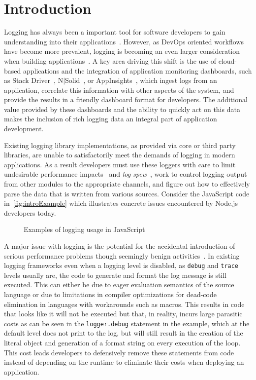\documentclass[sigplan,10pt]{acmart}
\begin{document}
\section{Introduction} 
\label{sec:intro}
Logging has always been a important tool for software developers to 
gain understanding into their applications~\cite{logdebug,logdebug2,logstudy}. 
However, as DevOps oriented workflows have
become more prevalent, logging is becoming an even larger consideration when
building applications~\cite{logstudy,logstudy2}. A key area driving this shift is the use of cloud-based
applications and the integration of application monitoring dashboards, such as
Stack Driver~\cite{StackDriver}, N$|$Solid~\cite{NSolid}, or
AppInsights~\cite{AppInsights}, which ingest logs from an application, correlate
this information with other aspects of the system, and provide the results in a friendly
dashboard format for developers. The additional value provided by these
dashboards and the ability to quickly act on this data makes the inclusion of
rich logging data an integral part of application development.

Existing logging library implementations, as provided via core or third party
libraries, are unable to satisfactorily meet the demands of logging in modern
applications. As a result developers must use these loggers with care to
limit undesirable performance impacts~\cite{learnlog} and \emph{log spew}~\cite{learnlog,logstudy2}, work 
to control logging output from other modules to the appropriate channels, and figure
out how to effectively parse the data that is written from various sources.
Consider the JavaScript code in~\autoref{fig:introExample} 
which illustrates concrete issues encountered by Node.js~\cite{Node} developers today.

\begin{figure*}[t]

\caption{Examples of logging usage in JavaScript}
\label{fig:introExample}
\end{figure*}

A major issue with logging is the potential for the accidental introduction 
of serious performance problems though seemingly benign activities~\cite{logdebug,logdebug2,logstudy,learnlog,logstudy2}. In 
existing logging frameworks even when a logging level is disabled, 
as \texttt{debug} and \texttt{trace} levels usually are, the code to generate 
and format the log message is still executed. This can either be due to eager 
evaluation semantics of the source language or due to limitations in compiler 
optimizations for dead-code elimination in languages with workarounds such as 
macros. This results in code that looks like it will not be executed but that, in 
reality, incurs large parasitic costs as can be seen in the \texttt{logger.debug} 
statement in the example, which at the default level does not print to the log, but will
still result in the creation of the literal object and generation of a format
string on every execution of the loop. This cost leads developers to defensively
remove these statements from code instead of depending on the runtime to
eliminate their costs when deploying an application.
\end{document}
